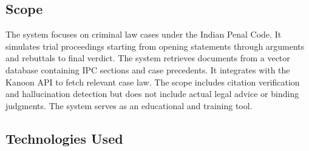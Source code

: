 \documentclass[12pt,singleside,a4paper]{article}
\begin{document}
\subsection{Scope}
The system focuses on criminal law cases under the Indian Penal Code. It simulates trial proceedings starting from opening statements through arguments and rebuttals to final verdict. The system retrieves documents from a vector database containing IPC sections and case precedents. It integrates with the Kanoon API to fetch relevant case law. The scope includes citation verification and hallucination detection but does not include actual legal advice or binding judgments. The system serves as an educational and training tool.

\subsection{Technologies Used}
\end{document}
